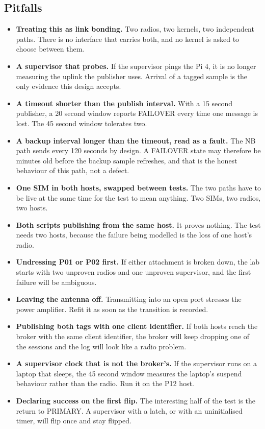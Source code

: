 \subsection*{Pitfalls}

\begin{itemize}
\item \textbf{Treating this as link bonding.} Two radios, two kernels, two independent paths. There is no interface that carries both, and no kernel is asked to choose between them.
\item \textbf{A supervisor that probes.} If the supervisor pings the Pi 4, it is no longer measuring the uplink the publisher uses. Arrival of a tagged sample is the only evidence this design accepts.
\item \textbf{A timeout shorter than the publish interval.} With a 15 second publisher, a 20 second window reports FAILOVER every time one message is lost. The 45 second window tolerates two.
\item \textbf{A backup interval longer than the timeout, read as a fault.} The NB path sends every 120 seconds by design. A FAILOVER state may therefore be minutes old before the backup sample refreshes, and that is the honest behaviour of this path, not a defect.
\item \textbf{One SIM in both hosts, swapped between tests.} The two paths have to be live at the same time for the test to mean anything. Two SIMs, two radios, two hosts.
\item \textbf{Both scripts publishing from the same host.} It proves nothing. The test needs two hosts, because the failure being modelled is the loss of one host's radio.
\item \textbf{Undressing P01 or P02 first.} If either attachment is broken down, the lab starts with two unproven radios and one unproven supervisor, and the first failure will be ambiguous.
\item \textbf{Leaving the antenna off.} Transmitting into an open port stresses the power amplifier. Refit it as soon as the transition is recorded.
\item \textbf{Publishing both tags with one client identifier.} If both hosts reach the broker with the same client identifier, the broker will keep dropping one of the sessions and the log will look like a radio problem.
\item \textbf{A supervisor clock that is not the broker's.} If the supervisor runs on a laptop that sleeps, the 45 second window measures the laptop's suspend behaviour rather than the radio. Run it on the P12 host.
\item \textbf{Declaring success on the first flip.} The interesting half of the test is the return to PRIMARY. A supervisor with a latch, or with an uninitialised timer, will flip once and stay flipped.
\end{itemize}

